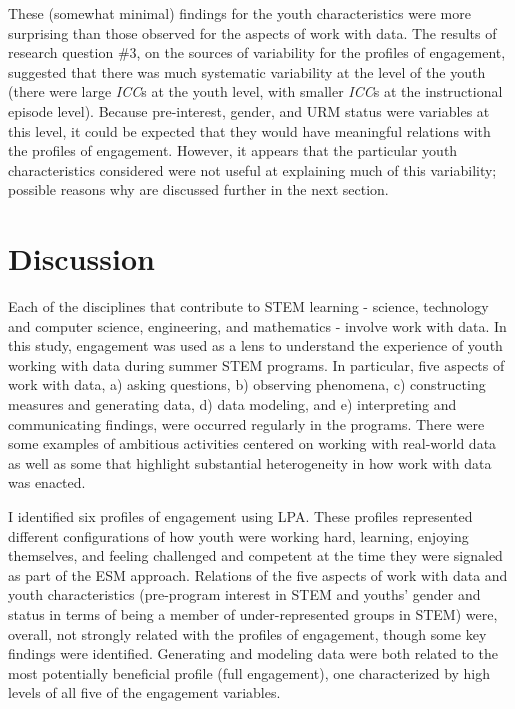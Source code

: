 \documentclass[]{msu-thesis}
\theoremstyle{definition}
\theoremstyle{definition}
\theoremstyle{definition}
\theoremstyle{remark}
\begin{document}
These (somewhat minimal) findings for the youth characteristics were
more surprising than those observed for the aspects of work with data.
The results of research question \#3, on the sources of variability for
the profiles of engagement, suggested that there was much systematic
variability at the level of the youth (there were large \emph{ICC}s at
the youth level, with smaller \emph{ICC}s at the instructional episode
level). Because pre-interest, gender, and URM status were variables at
this level, it could be expected that they would have meaningful
relations with the profiles of engagement. However, it appears that the
particular youth characteristics considered were not useful at
explaining much of this variability; possible reasons why are discussed
further in the next section.

\chapter{Discussion}\label{discussion}

Each of the disciplines that contribute to STEM learning - science,
technology and computer science, engineering, and mathematics - involve
work with data. In this study, engagement was used as a lens to
understand the experience of youth working with data during summer STEM
programs. In particular, five aspects of work with data, a) asking
questions, b) observing phenomena, c) constructing measures and
generating data, d) data modeling, and e) interpreting and communicating
findings, were occurred regularly in the programs. There were some
examples of ambitious activities centered on working with real-world
data as well as some that highlight substantial heterogeneity in how
work with data was enacted.

I identified six profiles of engagement using LPA. These profiles
represented different configurations of how youth were working hard,
learning, enjoying themselves, and feeling challenged and competent at
the time they were signaled as part of the ESM approach. Relations of
the five aspects of work with data and youth characteristics
(pre-program interest in STEM and youths' gender and status in terms of
being a member of under-represented groups in STEM) were, overall, not
strongly related with the profiles of engagement, though some key
findings were identified. Generating and modeling data were both related
to the most potentially beneficial profile (full engagement), one
characterized by high levels of all five of the engagement variables.
\end{document}

